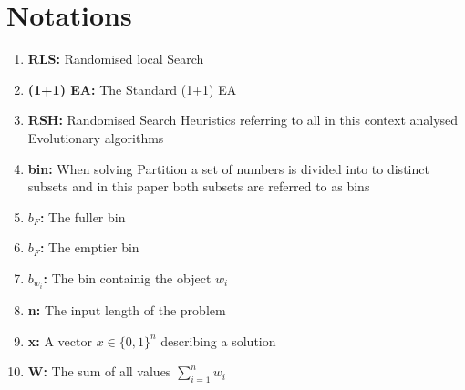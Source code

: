 \section{Notations}
\begin{enumerate}
    \item \textbf{RLS:} Randomised local Search
    \item \textbf{(1+1) EA:} The Standard (1+1) EA
    \item \textbf{RSH:} Randomised Search Heuristics referring to all in this context analysed Evolutionary algorithms
    \item \textbf{bin:} When solving Partition a set of numbers is divided into to distinct subsets and in this paper both subsets are referred to as bins
    \item \textbf{$b_F$:} The fuller bin
    \item \textbf{$b_F$:} The emptier bin
    \item \textbf{$b_{w_i}$:} The bin containig the object $w_i$
    \item \textbf{n:} The input length of the problem
    \item \textbf{x:} A vector $x \in \{0, 1\}^n$ describing a solution
    \item \textbf{W:} The sum of all values $\sum_{i=1}^{n}w_i$
\end{enumerate}
